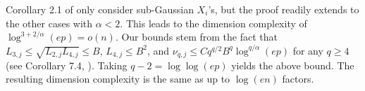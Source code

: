 \documentclass[aos]{imsart}
\begin{document}
Corollary 2.1 of  only consider  sub-Gaussian $X_i$'s, but the proof readily extends to the other cases with $\alpha < 2$.
This leads to the dimension complexity of $\log^{3 + 2/\alpha}(ep) = o(n)$.
Our bounds stem from the fact that $L_{3,j} \leq \sqrt{L_{2,j} L_{4,j}} \leq B$, $L_{4,j} \leq B^2$, and $\nu_{q,j} \leq C q^{q/2} B^{q} \log^{q/\alpha}(ep)$ for any $q \geq 4$ (see Corollary 7.4, \citealp{zhang2020concentration}). Taking $q-2 = \log\log(ep)$ yields the above bound. 
The resulting dimension complexity is the same as  up to $\log(en)$ factors.

    


\end{document}
